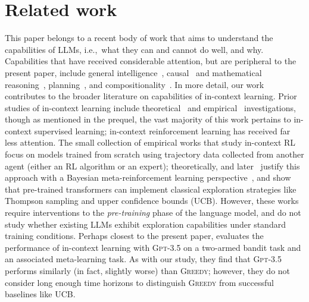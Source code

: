\documentclass[11pt]{article}
\newcommand{\gptthree}{\textsc{Gpt-3.5}\xspace}
\newcommand{\ucb}{\textsc{UCB}\xspace}
\newcommand{\greedy}{\textsc{Greedy}\xspace}
\newcommand{\ie}{{i.e.,~\xspace}}
\begin{document}
\section{Related work}
\label{sec:related}
This paper belongs to a recent body of work that aims to understand the capabilities of LLMs, \ie what they can and cannot do well, and why.
Capabilities that have received considerable attention, but are peripheral to the present paper, include general intelligence~\citep{bubeck2023sparks,binz2023using}, causal~\citep{kiciman2023causal,yiu2023imitation} and mathematical reasoning~\citep{cobbe2021training,lu2023mathvista}, planning~\citep{valmeekam2023planbench,momennejad2023evaluating,brooks2023large}, and compositionality~\citep{yu2023skill}.
In more detail, our work contributes to the broader literature on capabilities of in-context learning.
Prior studies of in-context learning include theoretical~\citep{xie2021explanation,akyurek2022learning,zhang2023and,abernethy2023mechanism,zhang2023trained,han2023explaining,cheng2023transformers,ahn2023transformers,wies2023learnability,fu2023transformers,wu2023many,huang2023context,hendel2023context,li2023transformers,von2023transformers,bai2023transformers,hahn2023theory,jeon2024information} and empirical~\citep{garg2022can,kirsch2022general,ahuja2023context,han2023understanding,raventos2023pretraining,weber2023icl,bhattamishra2023understanding,guo2023transformers,shen2023pretrained,akyurek2024context} investigations, though as
mentioned in the prequel, the vast majority of this work pertains to in-context
supervised learning; in-context reinforcement learning has received far less attention. The small collection of empirical
works that study in-context RL~\citep{laskin2022context,lee2023supervised,raparthy2023generalization,xu2022prompting} focus on models trained from scratch using trajectory data collected
from another agent (either an RL algorithm or an
expert); theoretically, \citet{lee2023supervised} and
later~\citet{lin2023transformers} justify this approach with a Bayesian
meta-reinforcement learning perspective~\citep{simchowitz2021bayesian},
and show that pre-trained transformers can implement classical
exploration strategies like Thompson sampling and upper confidence
bounds (UCB). However, these works require interventions to the
\emph{pre-training} phase of the language model, and do not study
whether existing LLMs exhibit exploration capabilities under standard
training conditions.
Perhaps closest to the present paper, \citet{coda2023meta} evaluates the performance of in-context learning with \gptthree on a two-armed bandit task and an associated meta-learning task. As with our study, they find that \gptthree performs similarly (in fact, slightly worse) than \greedy; however, they do not consider long enough time horizons to distinguish \greedy from successful baselines like \ucb.
\end{document}
